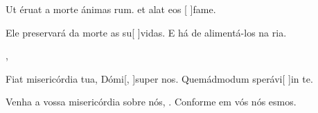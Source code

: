 {%
{\item Ut éruat a morte ánimas rum. {\ResponsoriumC} et alat eos [ ]{fa}me.}%
{\item Ele preservará da morte as su[ ]{vi}das. {\ResponsoriumC} E há de alimen\-tá-los na ria.},
{\item Fiat misericórdia tua, Dómi[, ]{su}per nos. {\ResponsoriumC} Quemádmodum sperávi[ ]{in} te.}%
{\item Venha a vossa misericórdia sobre nós, . {\ResponsoriumC} Conforme em vós nós esmos.}
}